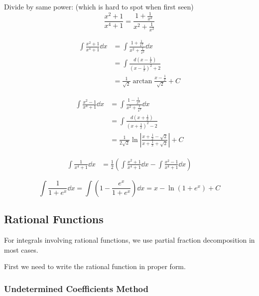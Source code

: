 \documentclass{overview}
\begin{document}
Divide by same power: (which is hard to spot when first seen)
\[
	\frac{x^2+1}{x^{4}+1} = \frac{1 + \frac{1}{x^2}}{x^2 + \frac{1}{x^2}}
\] 
\begin{example}
	\[
		\begin{aligned}
		\int \frac{x^2+1}{x^{4}+1} \dd x 
		&= \int \frac{1 + \frac{1}{x^2}}{x^2 + \frac{1}{x^2}} \dd x \\
		&= \int \frac{d(x - \frac{1}{x})}{(x - \frac{1}{x})^2 + 2} \\
		&= \frac{1}{\sqrt{2}} \arctan \frac{x - \frac{1}{x}}{\sqrt{2}} + C
		\end{aligned}
	\]
\end{example}
\begin{example}
	\[
		\begin{aligned}
			\int \frac{x^2-1}{x^{4}+1} \dd x 
			&= \int \frac{1 - \frac{1}{x^2}}{x^2 + \frac{1}{x^2}} \dd x \\
			&= \int \frac{d(x + \frac{1}{x})}{(x + \frac{1}{x})^2 - 2} \\
			&= \frac{1}{2\sqrt2} \ln \left| \frac{x + \frac{1}{x} - \sqrt{2}}{x + \frac{1}{x} + \sqrt{2}} \right| + C
		\end{aligned}
	\]
\end{example}
\begin{example}
\[
		\begin{aligned}
				\int \frac{1}{x^{4}+1} \dd x 
				&= \frac{1}{2} \left(\int \frac{x^2+1}{x^{4}+1} \dd x - \int \frac{x^2-1}{x^{4}+1} \dd x\right)
			\end{aligned}
	\] 
\end{example}

\begin{example}
	\[
		\int \frac{1}{1+e^x} \dd x = \int \left( 1 - \frac{e^x}{1+e^x} \right) \dd x
		= x - \ln(1+e^x) + C
	\]
\end{example}

\subsection{Rational Functions}

For integrals involving rational functions, we use partial fraction decomposition in
most cases.

First we need to write the rational function in proper form.

\subsubsection{Undetermined Coefficients Method}
\end{document}
